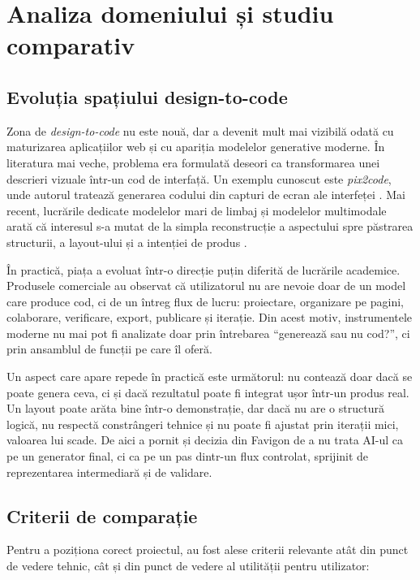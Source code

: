 \chapter{Analiza domeniului și studiu comparativ}

\section{Evoluția spațiului design-to-code}

Zona de \textit{design-to-code} nu este nouă, dar a devenit mult mai vizibilă odată cu maturizarea aplicațiilor web și cu apariția modelelor generative moderne. În literatura mai veche, problema era formulată deseori ca transformarea unei descrieri vizuale într-un cod de interfață. Un exemplu cunoscut este \textit{pix2code}, unde autorul tratează generarea codului din capturi de ecran ale interfeței \cite{beltramelli2017pix2code}. Mai recent, lucrările dedicate modelelor mari de limbaj și modelelor multimodale arată că interesul s-a mutat de la simpla reconstrucție a aspectului spre păstrarea structurii, a layout-ului și a intenției de produs \cite{shen2024uicoder,xu2025latcoder}.

În practică, piața a evoluat într-o direcție puțin diferită de lucrările academice. Produsele comerciale au observat că utilizatorul nu are nevoie doar de un model care produce cod, ci de un întreg flux de lucru: proiectare, organizare pe pagini, colaborare, verificare, export, publicare și iterație. Din acest motiv, instrumentele moderne nu mai pot fi analizate doar prin întrebarea ``generează sau nu cod?'', ci prin ansamblul de funcții pe care îl oferă.

Un aspect care apare repede în practică este următorul: nu contează doar dacă se poate genera ceva, ci și dacă rezultatul poate fi integrat ușor într-un produs real. Un layout poate arăta bine într-o demonstrație, dar dacă nu are o structură logică, nu respectă constrângeri tehnice și nu poate fi ajustat prin iterații mici, valoarea lui scade. De aici a pornit și decizia din Favigon de a nu trata AI-ul ca pe un generator final, ci ca pe un pas dintr-un flux controlat, sprijinit de reprezentarea intermediară și de validare.

\section{Criterii de comparație}

Pentru a poziționa corect proiectul, au fost alese criterii relevante atât din punct de vedere tehnic, cât și din punct de vedere al utilității pentru utilizator:

